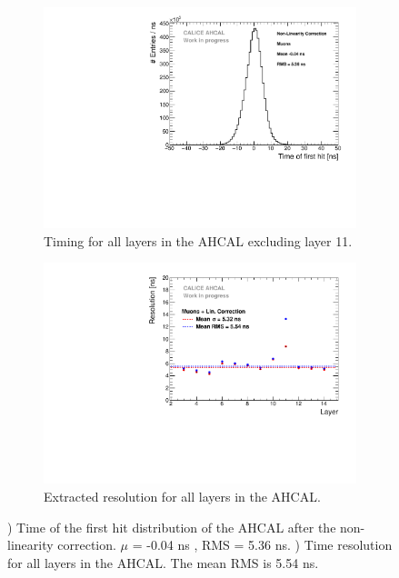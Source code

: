 \begin{figure}[htbp!]
	\begin{subfigure}[t]{0.5\textwidth}
		\centering
		\includegraphics[width=1\textwidth]{../Thesis_Plots/Timing/Muons/Plots/Timing_AHCAL_LinCorrection.pdf}
		\caption{Timing for all layers in the AHCAL excluding layer 11.}\label{fig:timing_lincorrection}
	\end{subfigure}
	\hfill
	\begin{subfigure}[t]{0.5\textwidth}
		\centering
		\includegraphics[width=1\textwidth]{../Thesis_Plots/Timing/Muons/Plots/ResolutionPerModule_LinCorrection.pdf}
		\caption{Extracted resolution for all layers in the AHCAL.}\label{fig:reso_lincorrection}
	\end{subfigure}
	\caption{) Time of the first hit distribution of the AHCAL after the non-linearity correction. $\mu$ = -0.04 ns , RMS = 5.36 ns. ) Time resolution for all layers in the AHCAL. The mean RMS is 5.54 ns.}
\end{figure}

